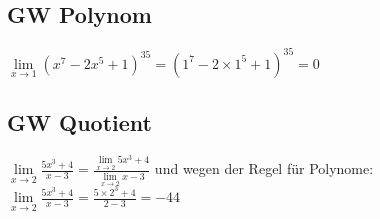 \documentclass[../main.tex]{subfiles}
\begin{document}
\subsection{GW Polynom}
\label{sec:GW_Polynom}
\begin{math}
    \lim\limits_{x\to 1} (x^7 - 2x^5 + 1)^{35} = (1^7 - 2 \times 1^5 +  1)^{35} = 0
\end{math}

\subsection{GW Quotient}
\label{sec:GW_Quotient}
\begin{math}
    \lim\limits_{x\to 2} \frac{5x^3 + 4}{x -3} = \frac{\lim\limits_{x\to 2}5x^3 + 4}{\lim\limits_{x\to 2}x -3}
\end{math}
und wegen der Regel für Polynome: \\ [7pt]
\begin{math}
    \lim\limits_{x\to 2} \frac{5x^3 + 4}{x -3} = \frac{5 \times 2^3 + 4}{2 -3} = -44
\end{math}
\end{document}
